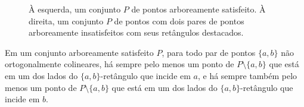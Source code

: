 \begin{figure}[h!]
    \centering
    \begin{minipage}[b]{0.45\textwidth}
        \centering
    \end{minipage}\hfill
    \begin{minipage}[b]{0.45\textwidth}
        \centering
    \end{minipage}
    \caption{À esquerda, um conjunto $P$ de pontos arboreamente satisfeito. À direita, um conjunto $P$ de pontos com dois pares de pontos arboreamente insatisfeitos com seus retângulos destacados.}
\label{fig:geometria-inicial}
\end{figure}

\begin{lemma}
\label{lem:pontos_em_arestas_incidentes}
Em um conjunto arboreamente satisfeito $P$, para todo par de pontos $\{a,b\}$ não ortogonalmente colineares, há sempre pelo menos um ponto de \( P \setminus \{a,b\} \) que está em um dos lados do $\{a,b\}$-retângulo que incide em $a$, e há sempre também pelo menos um ponto de \( P \setminus \{a,b\} \) que está em um dos lados do $\{a,b\}$-retângulo que incide em $b$.
\end{lemma}


